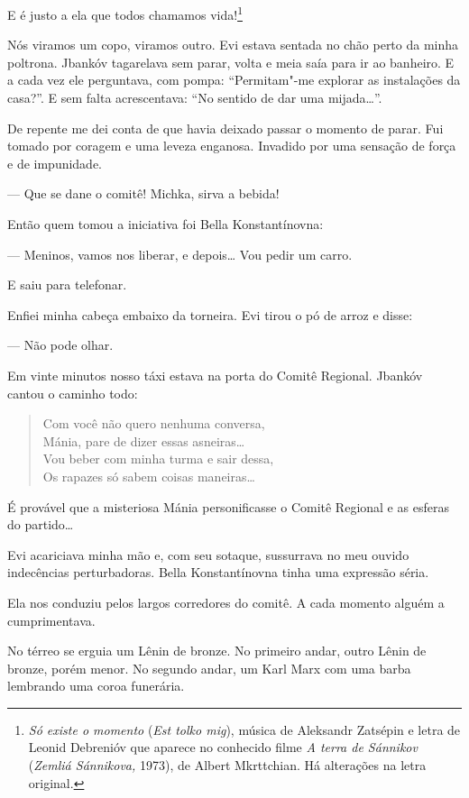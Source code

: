 E é justo a ela que todos chamamos vida!\footnote{\emph{Só existe o
  momento} (\emph{Est tolko mig}), música de Aleksandr Zatsépin e
  letra de Leonid Debrenióv que aparece no conhecido filme \emph{A terra
  de Sánnikov} (\emph{Zemliá Sánnikova,} 1973), de Albert
  Mkrttchian. Há alterações na letra original.}

Nós viramos um copo, viramos outro. Evi estava sentada no chão perto da
minha poltrona. Jbankóv tagarelava sem parar, volta e meia saía para ir
ao banheiro. E a cada vez ele perguntava, com pompa: ``Permitam"-me
explorar as instalações da casa?''. E sem falta acrescentava: ``No
sentido de dar uma mijada\ldots{}''.

De repente me dei conta de que havia deixado passar o momento de parar.
Fui tomado por coragem e uma leveza enganosa. Invadido por uma sensação
de força e de impunidade.

--- Que se dane o comitê! Michka, sirva a bebida!

Então quem tomou a iniciativa foi Bella Konstantínovna:

--- Meninos, vamos nos liberar, e depois\ldots{} Vou pedir um carro.

E saiu para telefonar.

Enfiei minha cabeça embaixo da torneira. Evi tirou o pó de arroz e
disse:

--- Não pode olhar.

Em vinte minutos nosso táxi estava na porta do Comitê Regional. Jbankóv
cantou o caminho todo:

\begin{verse}
Com você não quero nenhuma conversa,\\
Mánia, pare de dizer essas asneiras\ldots{}\\
Vou beber com minha turma e sair dessa,\\
Os rapazes só sabem coisas maneiras\ldots{}
\end{verse}

É provável que a misteriosa Mánia personificasse o Comitê Regional e as
esferas do partido\ldots{}

Evi acariciava minha mão e, com seu sotaque, sussurrava no meu ouvido
indecências perturbadoras. Bella Konstantínovna tinha uma expressão
séria.

Ela nos conduziu pelos largos corredores do comitê. A cada momento
alguém a cumprimentava.

No térreo se erguia um Lênin de bronze. No primeiro andar, outro Lênin
de bronze, porém menor. No segundo andar, um Karl Marx com uma barba
lembrando uma coroa funerária.

